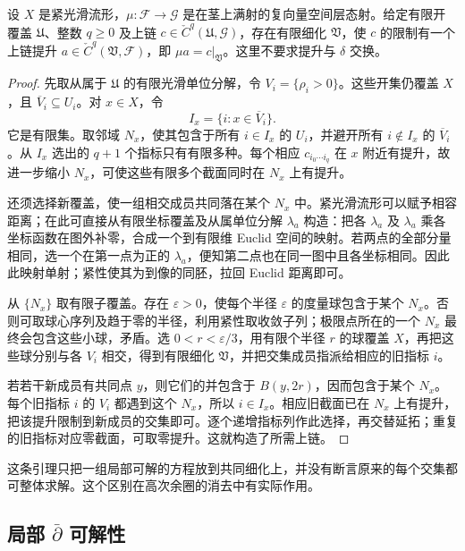 \begin{lemma}
\label{g4:lem:0302:cochain-lifting}
设 \(X\) 是紧光滑流形，\(\mu:\mathcal F\to\mathcal G\) 是在茎上满射的复向量空间层态射。给定有限开覆盖 \(\mathfrak U\)、整数 \(q\geq0\) 及上链 \(c\in\check C^q(\mathfrak U,\mathcal G)\)，存在有限细化 \(\mathfrak V\)，使 \(c\) 的限制有一个上链提升 \(a\in\check C^q(\mathfrak V,\mathcal F)\)，即 \(\mu a=c|_{\mathfrak V}\)。这里不要求提升与 \(\delta\) 交换。
\end{lemma}
\begin{proof}
先取从属于 \(\mathfrak U\) 的有限光滑单位分解，令 \(V_i=\{\rho_i>0\}\)。这些开集仍覆盖 \(X\)，且 \(\overline V_i\subseteq U_i\)。对 \(x\in X\)，令
\[
 I_x=\{i:x\in\overline V_i\}.
\]
它是有限集。取邻域 \(N_x\)，使其包含于所有 \(i\in I_x\) 的 \(U_i\)，并避开所有 \(i\notin I_x\) 的 \(\overline V_i\)。从 \(I_x\) 选出的 \(q+1\) 个指标只有有限多种。每个相应 \(c_{i_0\cdots i_q}\) 在 \(x\) 附近有提升，故进一步缩小 \(N_x\)，可使这些有限多个截面同时在 \(N_x\) 上有提升。

还须选择新覆盖，使一组相交成员共同落在某个 \(N_x\) 中。紧光滑流形可以赋予相容距离；在此可直接从有限坐标覆盖及从属单位分解 \(\lambda_a\) 构造：把各 \(\lambda_a\) 及 \(\lambda_a\) 乘各坐标函数在图外补零，合成一个到有限维 Euclid 空间的映射。若两点的全部分量相同，选一个在第一点为正的 \(\lambda_a\)，便知第二点也在同一图中且各坐标相同。因此此映射单射；紧性使其为到像的同胚，拉回 Euclid 距离即可。

从 \(\{N_x\}\) 取有限子覆盖。存在 \(\varepsilon>0\)，使每个半径 \(\varepsilon\) 的度量球包含于某个 \(N_x\)。否则可取球心序列及趋于零的半径，利用紧性取收敛子列；极限点所在的一个 \(N_x\) 最终会包含这些小球，矛盾。选 \(0<r<\varepsilon/3\)，用有限个半径 \(r\) 的球覆盖 \(X\)，再把这些球分别与各 \(V_i\) 相交，得到有限细化 \(\mathfrak V\)，并把交集成员指派给相应的旧指标 \(i\)。

若若干新成员有共同点 \(y\)，则它们的并包含于 \(B(y,2r)\)，因而包含于某个 \(N_x\)。每个旧指标 \(i\) 的 \(V_i\) 都遇到这个 \(N_x\)，所以 \(i\in I_x\)。相应旧截面已在 \(N_x\) 上有提升，把该提升限制到新成员的交集即可。逐个递增指标列作此选择，再交替延拓；重复的旧指标对应零截面，可取零提升。这就构造了所需上链。
\end{proof}

这条引理只把一组局部可解的方程放到共同细化上，并没有断言原来的每个交集都可整体求解。这个区别在高次余圈的消去中有实际作用。
\subsection{\texorpdfstring{局部 \(\bar{\partial}\) 可解性}{局部 \={∂} 可解性}}
\label{g4:subsec:0302:03}

